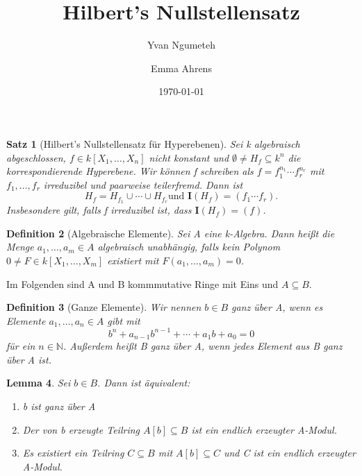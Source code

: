 \documentclass{article}
\title{Hilbert's Nullstellensatz}
\date{\today}
\author{Yvan Ngumeteh \and Emma Ahrens}
\newtheorem{satz}{Satz}
\newtheorem{definition}[satz]{Definition}
\newtheorem{lemma}[satz]{Lemma}
\begin{document}
\maketitle
	
	\begin{satz}[Hilbert's Nullstellensatz für Hyperebenen]
	Sei k algebraisch abgeschlossen, \(f \in k[X_1,\ldots,X_n]\) nicht
	konstant und \(\emptyset \neq H_f \subseteq k^n\) die korrespondierende
	Hyperebene. Wir können f schreiben als \(f = f_1^{n_1}\cdots f_r^{n_r}\)
	mit \(f_1,\ldots,f_r\) irreduzibel und paarweise teilerfremd. Dann ist
	\begin{displaymath} H_f = H_{f_1} \cup \cdots \cup H_{f_r} \text{und }
	\mathbf{I}(H_f) = (f_1\cdots f_r). \end{displaymath}
	Insbesondere gilt, falls f irreduzibel ist, dass \(\mathbf{I}(H_f) = (f)\).
	\end{satz}

	\begin{definition}[Algebraische Elemente]
	Sei A eine k-Algebra. Dann heißt die Menge \(a_1,\ldots, a_m \in A\)
	algebraisch unabhängig, falls kein Polynom \(0 \neq F \in k[X_1,\ldots,X_m]
	\) existiert mit \(F(a_1,\ldots,a_m) = 0\).
	\end{definition}

	Im Folgenden sind A und B kommmutative Ringe mit Eins und \(A \subseteq B\).

	\begin{definition}[Ganze Elemente]
	Wir nennen \(b \in B\) ganz über A, wenn es Elemente \(a_1, \ldots, a_n \in
	A\) gibt mit
	\begin{displaymath} b^n + a_{n-1}b^{n-1} + \cdots + a_1b + a_0 = 0
	\end{displaymath} für ein \(n \in \mathbb{N}\).
	Außerdem heißt B ganz über A, wenn jedes Element aus B ganz über A ist.
	\end{definition}

	\begin{lemma}
	Sei \(b \in B\). Dann ist äquivalent:
	\begin{enumerate}
	\item b ist ganz über A
	\item Der von b erzeugte Teilring \(A[b] \subseteq B\) ist ein endlich
	erzeugter A-Modul.
	\item Es existiert ein Teilring \(C \subseteq B\) mit \(A[b] \subseteq C\)
	und C ist ein endlich erzeugter A-Modul.
	\end{enumerate}
	\end{lemma}
\end{document}
